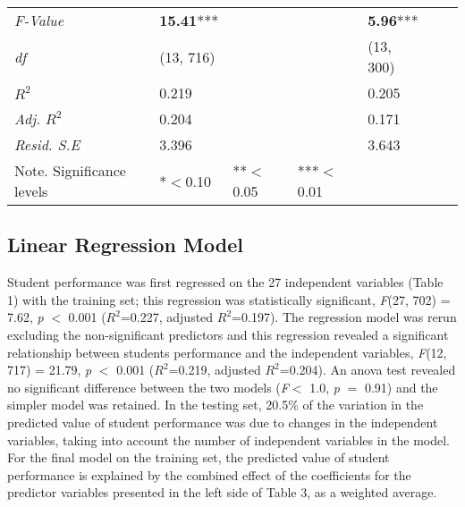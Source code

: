 \documentclass[sigconf]{acmart}
\begin{document}
\begin{table*}[ht]
\begin{tabular}{lllllll}
    \textit{F-Value}    & \textbf{15.41}***  &       &        & \textbf{5.96}***    &       &       \\
    \textit{df}         &   (13, 716)        &       &        &      (13, 300)      &       &       \\
    \textit{$R^2$}      &      0.219         &       &        &         0.205       &       &       \\ 
    \textit{Adj. $R^2$} &      0.204         &       &        &         0.171       &       &       \\
    \textit{Resid. S.E} &      3.396         &       &        &         3.643       &       &       \\
    \bottomrule
    Note. Significance levels & *$<$0.10      & **$<$0.05  & ***$<$0.01 & & &
  \end{tabular}
\end{table*}



\subsection{Linear Regression Model}

Student performance was first regressed on the 27 independent variables 
(Table 1) with the training set; this regression was statistically significant, 
\textit{F}(27, 702) = 7.62, \textit{p} $<$ 0.001 ($R^2$=0.227, adjusted 
$R^2$=0.197). The regression model was rerun excluding the non-significant 
predictors and this regression revealed a significant relationship between
students performance and the independent variables, \textit{F}(12, 717) = 21.79, 
\textit{p} $<$ 0.001 ($R^2$=0.219, adjusted $R^2$=0.204). An anova test revealed 
no significant difference between the two models (\textit{F}$<$ 1.0, 
\textit{p} $=$ 0.91) and the simpler model was retained. In the testing set,
20.5\% of the variation in the predicted value of student performance was due to 
changes in the independent variables, taking into account the number of 
independent variables in the model. For the final model on the training set, 
the predicted value of student performance is explained by the combined effect 
of the coefficients for the predictor variables presented in the left side of 
Table 3, as a weighted average.


\end{document}
